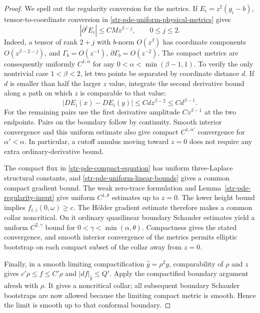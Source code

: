 \begin{proof}
We spell out the regularity conversion for the metrics.
If $E_i=z^2(g_i-b)$, tensor-to-coordinate conversion in
\eqref{str-pde-uniform-physical-metrics} gives
\begin{equation}\label{str-pde-weight-conversion}
 |\partial^j E_i|\leq C M z^{\beta-j},\qquad 0\leq j\leq2.
\end{equation}
Indeed, a tensor of rank $2+j$ with $b$-norm $O(z^\beta)$
has coordinate components $O(z^{\beta-2-j})$, and
$\Gamma_b=O(z^{-1})$, $\partial\Gamma_b=O(z^{-2})$.
The compact metrics are consequently uniformly $C^{1,\alpha}$
for any $0<\alpha<\min(\beta-1,1)$. To verify the only
nontrivial case $1<\beta<2$, let two points be separated by
coordinate distance $d$. If $d$ is smaller than half the
larger $z$ value, integrate the second derivative bound
along a path on which $z$ is comparable to that value:
\[
 |DE_i(x)-DE_i(y)|\leq C d z^{\beta-2}
 \leq C d^{\beta-1}.
\]
For the remaining pairs use the first derivative amplitude
$Cz^{\beta-1}$ at the two endpoints. Pairs on the boundary
follow by continuity. Smooth interior convergence and this
uniform estimate also give compact $C^{1,\alpha'}$
convergence for $\alpha'<\alpha$. In particular, a cutoff
annulus moving toward $z=0$ does not require any extra
ordinary-derivative bound.

The compact flux in \eqref{str-pde-compact-equation} has
uniform three-Laplace structural constants, and
\eqref{str-pde-uniform-linear-bounds} gives a common compact
gradient bound. The weak zero-trace formulation and
Lemma~\ref{str-pde-regularity-input} give uniform
$C^{1,\theta}$ estimates up to $z=0$. The lower height
bound implies $f_{i,z}(0,\omega)\geq c$. The H\"older
gradient estimate therefore makes a common collar
noncritical. On it ordinary quasilinear boundary Schauder
estimates yield a uniform $C^{2,\gamma}$ bound for
$0<\gamma<\min(\alpha,\theta)$. Compactness gives the
stated convergence, and smooth interior convergence of
the metrics permits elliptic bootstrap on each compact
subset of the collar away from $z=0$.

Finally, in a smooth limiting compactification
$\widehat g=\rho^2g$, comparability of $\rho$ and $z$ gives
$c'\rho\leq f\leq C'\rho$ and
$|df|_{\widehat g}\leq Q'$. Apply the compactified boundary
argument afresh with $\rho$. It gives a noncritical collar;
all subsequent boundary Schauder bootstraps are now allowed
because the limiting compact metric is smooth. Hence the
limit is smooth up to that conformal boundary.
\end{proof}

